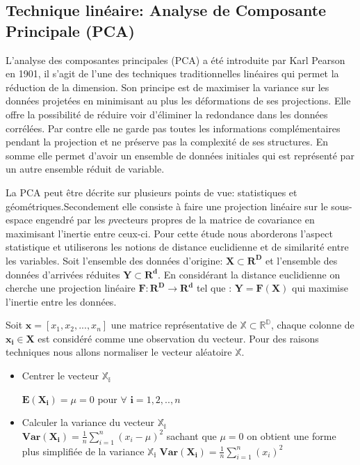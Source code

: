 \documentclass[twoside,twocolumn]{article}
\begin{document}
\subsection{Technique linéaire: Analyse de Composante Principale (PCA)}
 
L’analyse des composantes principales (PCA) a été introduite par Karl Pearson en 1901, il s’agit de l’une des techniques traditionnelles linéaires qui permet la réduction de la dimension. Son principe est de maximiser la variance sur les données projetées en minimisant au plus les déformations de ses projections. Elle offre la possibilité de réduire voir d'éliminer la redondance dans les données corrélées. Par contre elle ne garde pas toutes les informations complémentaires pendant la projection et ne préserve pas la complexité de ses structures. En somme elle permet d’avoir un ensemble de données initiales qui est représenté par un autre ensemble réduit de variable.\cite{Wang12}

La PCA peut être décrite sur plusieurs points de vue: statistiques et géométriques.Secondement elle consiste à faire une projection linéaire sur le sous-espace engendré par les $p$vecteurs propres de la matrice de covariance en maximisant l’inertie entre ceux-ci. Pour cette étude nous aborderons l’aspect statistique et utiliserons les notions de distance euclidienne et de similarité entre les variables.  
Soit l’ensemble des données d’origine:
$ \mathbf{X \subset R^D}$ et l’ensemble des données d’arrivées réduites $\mathbf{Y \subset R^d}$. En considérant la  distance euclidienne on cherche une projection linéaire $\mathbf{ F: R^D \rightarrow R^d}$ tel que : $\mathbf{Y = F(X)}$ qui  maximise l’inertie entre les données. \cite{Wang12} 

Soit $\mathbf {x} =[x_1, x_2, ..., x_n]$ une matrice représentative de $\mathbb{ X \subset R^D}$, chaque colonne de $\mathbf{x_i \in X}$ est considéré comme une observation du vecteur. Pour des raisons techniques nous allons normaliser le vecteur aléatoire $\mathbb{X}$. 
\begin{itemize}
\item Centrer le vecteur $\mathbb{X_i}$

$\mathbf{E(X_i)}=\mu=0$ pour $ \forall$ $\mathbf{i}=1, 2, .., n$
\item Calculer la variance du vecteur $\mathbb{X_i}$ \\
$\mathbf{Var(X_i)}=\frac{1}{n}\sum_{i=1}^{n}( x_i-\mu )^2$ sachant que $\mu=0$
on obtient une forme plus simplifiée de la variance $\mathbb{X_i}$ 
$\mathbf{Var(X_i)}=\frac{1}{n}\sum_{i=1}^{n}\left(x_i\right)^2$
\end{itemize}
\end{document}
